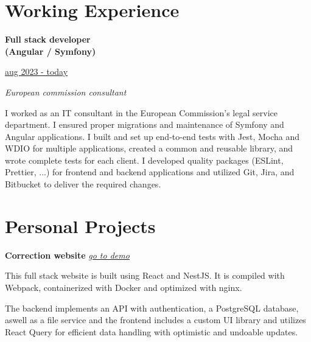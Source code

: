 \documentclass[11pt, oneside, a4paper, titlepage]{article}
\begin{document}
\begin{tcolorbox}[colframe=white, colback=white]
\begin{minipage}[t]{0.35\linewidth}
  \end{minipage}
  \hfill
  \begin{minipage}[t]{0.60\linewidth}

    \section*{Working Experience}

    \begin{minipage}{0.45\linewidth}
      \textbf{Full stack developer} \\ 
      \textbf{(Angular / Symfony)}
    \end{minipage}
    \begin{minipage}{0.5\linewidth}
      \begin{flushright}
        \underline{aug 2023 - today}
      \end{flushright}
    \end{minipage}
    \vspace{0.3cm}

    \emph{European commission consultant} 
    \vspace{0.3cm}

    \small{
      I worked as an IT consultant in the European Commission's legal 
      service department. I ensured proper migrations and maintenance of Symfony 
      and Angular applications. I built and set up end-to-end tests with Jest, 
      Mocha and WDIO for multiple applications, created a common and reusable 
      library, and wrote complete tests for each client. 
      I developed quality packages (ESLint, Prettier, ...) for frontend and 
      backend applications and utilized Git, Jira, and Bitbucket to deliver the 
      required changes.
    }
    \medbreak

    \section*{Personal Projects 
      \small{}
    }

    \textbf{Correction website} 
    \emph{
      \href{https://tamighi.github.io/work/correction-website-demo}{\underline{go to demo}}
    }
    \medbreak

    \small{
      This full stack website is built using React and NestJS. It is compiled 
      with Webpack, containerized with Docker and optimized with nginx.

      The backend implements an API with authentication, a PostgreSQL database, 
      aswell as a file service and the frontend includes a custom UI library and 
      utilizes React Query for efficient data handling with optimistic and 
      undoable updates.
    }
    \vspace{0.4cm}


\end{minipage}
\end{tcolorbox}
\end{document}
